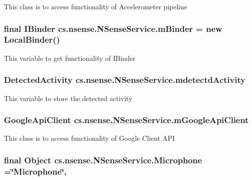 This class is to access functionality of Accelerometer pipeline \hypertarget{classcs_1_1nsense_1_1_n_sense_service_a600df19b5f1386cedb4cec1dcdc6bc1c}{
\subsubsection[{m\-Binder}]{\setlength{\rightskip}{0pt plus 5cm}final I\-Binder cs.\-nsense.\-N\-Sense\-Service.\-m\-Binder = new {\bf Local\-Binder}()\hspace{0.3cm}{\ttfamily [private]}}}\label{classcs_1_1nsense_1_1_n_sense_service_a600df19b5f1386cedb4cec1dcdc6bc1c}
This variable to get functionality of I\-Binder \hypertarget{classcs_1_1nsense_1_1_n_sense_service_ac380c449787b843e6c419d2c372c5644}{
\subsubsection[{mdetectd\-Activity}]{\setlength{\rightskip}{0pt plus 5cm}Detected\-Activity cs.\-nsense.\-N\-Sense\-Service.\-mdetectd\-Activity\hspace{0.3cm}{\ttfamily [protected]}}}\label{classcs_1_1nsense_1_1_n_sense_service_ac380c449787b843e6c419d2c372c5644}
This variable to store the detected activity \hypertarget{classcs_1_1nsense_1_1_n_sense_service_a8b5bcd278223c26fb1c2a898df43918a}{
\subsubsection[{m\-Google\-Api\-Client}]{\setlength{\rightskip}{0pt plus 5cm}Google\-Api\-Client cs.\-nsense.\-N\-Sense\-Service.\-m\-Google\-Api\-Client\hspace{0.3cm}{\ttfamily [protected]}}}\label{classcs_1_1nsense_1_1_n_sense_service_a8b5bcd278223c26fb1c2a898df43918a}
This class is to access functionality of Google Client A\-P\-I \hypertarget{classcs_1_1nsense_1_1_n_sense_service_a0aa5e7fd66148e7d49d70403081998c9}{
\subsubsection[{Microphone}]{\setlength{\rightskip}{0pt plus 5cm}final Object cs.\-nsense.\-N\-Sense\-Service.\-Microphone =\char`\"{}Microphone\char`\"{}\hspace{0.3cm}{\ttfamily [static]}, {\ttfamily [private]}}}\label{classcs_1_1nsense_1_1_n_sense_service_a0aa5e7fd66148e7d49d70403081998c9}
